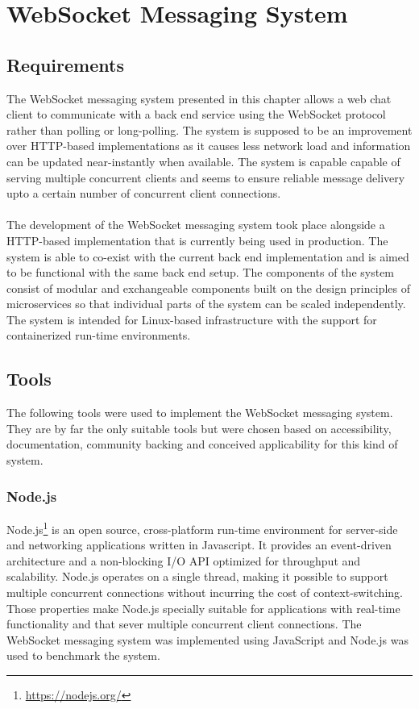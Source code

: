\chapter{WebSocket Messaging System}
\label{chapter:websocketMessagingSystem}

\section{Requirements}

The WebSocket messaging system presented in this chapter allows a web chat client to communicate with a back end service using the WebSocket protocol rather than polling or long-polling. The system is supposed to be an improvement over HTTP-based implementations as it causes less network load and information can be updated near-instantly when available. The system is capable capable of serving multiple concurrent clients and seems to ensure reliable message delivery upto a certain number of concurrent client connections.
\\ \\
The development of the WebSocket messaging system took place alongside a HTTP-based implementation that is currently being used in production. The system is able to co-exist with the current back end implementation and is aimed to be functional with the same back end setup. The components of the system consist of modular and exchangeable components built on the design principles of microservices so that individual parts of the system can be scaled independently. The system is intended for Linux-based infrastructure with the support for containerized run-time environments.

\section{Tools}

The following tools were used to implement the WebSocket messaging system. They are by far the only suitable tools but were chosen based on accessibility, documentation, community backing and conceived applicability for this kind of system.

\subsection{Node.js}

Node.js\footnote{\url{https://nodejs.org/}} is an open source, cross-platform run-time environment for server-side and networking applications written in Javascript. It provides an event-driven architecture and a non-blocking I/O API optimized for throughput and scalability. Node.js operates on a single thread, making it possible to support multiple concurrent connections without incurring the cost of context-switching. Those properties make Node.js specially suitable for applications with real-time functionality and that sever multiple concurrent client connections. The WebSocket messaging system was implemented using JavaScript and Node.js was used to benchmark the system.

